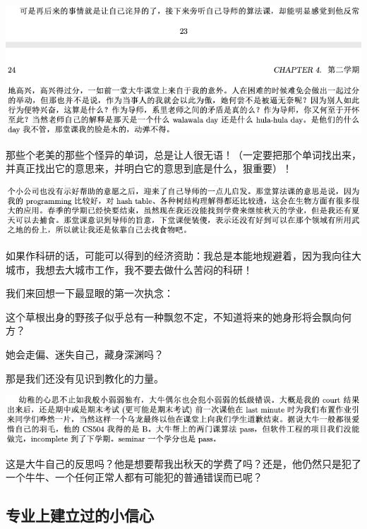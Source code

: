 \documentclass[9pt, b5paper]{article}
\begin{document}
\begin{center}
\includegraphics[width=.9\linewidth]{./pic/backups_plans_20210424_213954.png}
\end{center}

那些个老美的那些个怪异的单词，总是让人很无语！（一定要把那个单词找出来，并真正找出它的意思来，并明白它的意思到底是什么，狠重要）！

\begin{center}
\includegraphics[width=.9\linewidth]{./pic/backups_plans_20210424_214124.png}
\end{center}

如果作科研的话，可能可以得到的经济资助：我总是本能地规避着，因为我向往大城市，我想去大城市工作，我不要去做什么苦闷的科研！

我们来回想一下最显眼的第一次执念：

这个草根出身的野孩子似乎总有一种飘忽不定，不知道将来的她身形将会飘向何方？

她会走偏、迷失自己，藏身深渊吗？

那是我们还没有见识到教化的力量。 

\begin{center}
\includegraphics[width=.9\linewidth]{./pic/backups_plans_20210424_215618.png}
\end{center}

这是大牛自己的反思吗？他是想要帮我出秋天的学费了吗？还是，他仍然只是犯了一个牛牛、一个任何正常人都有可能犯的普通错误而已呢？

\subsection{专业上建立过的小信心}
\label{sec:org578d0a3}
\end{document}
